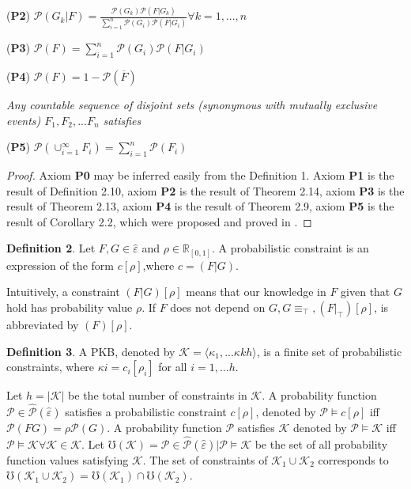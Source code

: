\documentclass[]{iosart2c}
\begin{document}
  (\textbf{P2}) $\mathcal{P}(G_k|F) = \frac{\mathcal{P}(G_k)\mathcal{P}(F|G_k)}{\sum_{i=1}^{n} \mathcal{P}(G_i)\mathcal{P}(F|G_i)} \forall k = 1, ..., n$

  (\textbf{P3}) $\mathcal{P}(F) = \sum_{i=1}^{n} {\mathcal{P}(G_i)\mathcal{P}(F|G_i)}$

  (\textbf{P4}) $\mathcal{P}(F) = 1 - \mathcal{P}(\overline F)$

  \textit{Any countable sequence of disjoint sets (synonymous with mutually exclusive events) $F_1, F_2, ... F_n$ satisfies}

  (\textbf{P5}) $\mathcal{P}(\cup_{i=1}^\infty F_i) = \sum_{i=1}^n \mathcal{P}(F_i)$

  \begin{proof}
    Axiom \textbf{P0} may be inferred easily from the Definition 1. Axiom \textbf{P1} is the result of Definition 2.10, axiom \textbf{P2} is the result of Theorem 2.14, axiom \textbf{P3} is the result of Theorem 2.13, axiom \textbf{P4} is the result of Theorem 2.9, axiom \textbf{P5} is the result of Corollary 2.2, which were proposed and proved in \cite{27}.
  \end{proof}


  \textbf{Definition 2}. Let $F,G \in \hat{\varepsilon}$ and $\rho \in \mathbb{R}_{[0,1]}$. A probabilistic constraint is an expression of the form $c[\rho]$,where $c = (F|G)$.

  Intuitively, a constraint $(F|G)[\rho]$ means that our knowledge in $F$ given that $G$  hold has probability value $\rho$. If $F$ does not depend on $G,G \equiv _\top, (F|_\top)[\rho]$, is abbreviated by $(F)[\rho]$.

  \textbf{Definition 3}. A PKB, denoted by $\mathcal{K} = \langle \kappa_1, ... \kappa kh \rangle$, is a finite set of probabilistic constraints, where $\kappa i = c_i[\rho_i]$ for all $i = 1, ... h$.

  Let $h = |\mathcal{K}|$ be the total number of constraints in $\mathcal{K}$. A probability function $\mathcal{P} \in \hat{\mathcal{P}} (\hat{\varepsilon})$ satisfies a probabilistic constraint $c[\rho]$, denoted by $\mathcal{P} \models c[\rho]$ iff $\mathcal{P}(FG) = \rho\mathcal{P}(G)$. A probability function $\mathcal{P}$ satisfies $\mathcal{K}$ denoted by $\mathcal{P} \models \mathcal{K}$ iff $\mathcal{P} \models \mathcal{K}\forall \mathcal{K} \in \mathcal{K}$. Let $\mho (\mathcal{K}) = {\mathcal{P} \in \hat{\mathcal{P}} (\hat{\varepsilon})|\mathcal{P} \models \mathcal{K}}$ be the set of all probability function values satisfying $\mathcal{K}$. The set of constraints of $\mathcal{K}_1 \cup \mathcal{K}_2$ corresponds to $\mho(\mathcal{K}_1 \cup \mathcal{K}_2) = \mho(\mathcal{K}_1) \cap \mho (\mathcal{K}_2)$.
\end{document}
